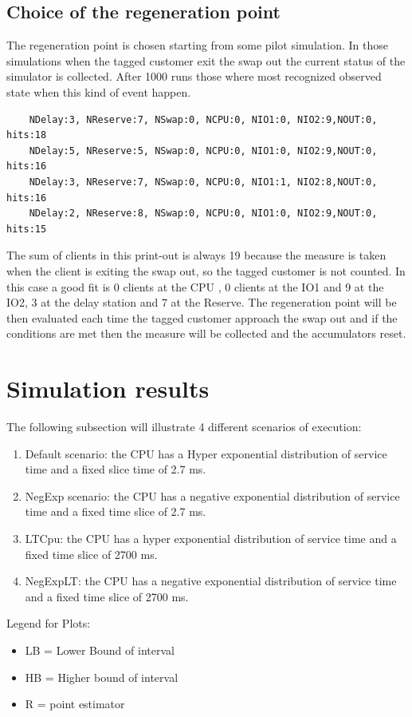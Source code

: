 \documentclass[12pt,a4paper]{article}
\begin{document}
\subsection{Choice of the regeneration point}
The regeneration point is chosen starting from some pilot simulation. In those simulations when the tagged customer exit the swap out the current status of the simulator is collected. After 1000 runs those where most recognized observed state when this kind of event happen.
\begin{verbatim}
    NDelay:3, NReserve:7, NSwap:0, NCPU:0, NIO1:0, NIO2:9,NOUT:0, hits:18
    NDelay:5, NReserve:5, NSwap:0, NCPU:0, NIO1:0, NIO2:9,NOUT:0, hits:16
    NDelay:3, NReserve:7, NSwap:0, NCPU:0, NIO1:1, NIO2:8,NOUT:0, hits:16
    NDelay:2, NReserve:8, NSwap:0, NCPU:0, NIO1:0, NIO2:9,NOUT:0, hits:15
\end{verbatim}
The sum of clients in this print-out is always 19 because the measure is taken when the client is exiting the swap out, so the tagged customer is not counted. In this case a good fit is 0 clients at the CPU , 0 clients at the IO1 and 9 at the IO2, 3 at the delay station and 7 at the Reserve. The regeneration point will be then evaluated each time the tagged customer approach the swap out and if the conditions are met then the measure will be collected and the accumulators reset.

\section{Simulation results}
The following subsection will illustrate 4 different scenarios of execution:
\begin{enumerate}
    \item Default scenario: the CPU has a Hyper exponential distribution of service time and a fixed slice time of 2.7 ms.
    \item NegExp scenario: the CPU has a negative exponential distribution of service time and a fixed time slice of 2.7 ms.
    \item LTCpu: the CPU has a hyper exponential distribution of service time and a fixed time slice of 2700 ms.
    \item NegExpLT: the CPU has a negative exponential distribution of service time and a fixed time slice of 2700 ms.
\end{enumerate}
Legend for Plots:
\begin{itemize}
    \item LB = Lower Bound of interval 
    \item HB = Higher bound of interval 
    \item R = point estimator
\end{itemize}
\end{document}
